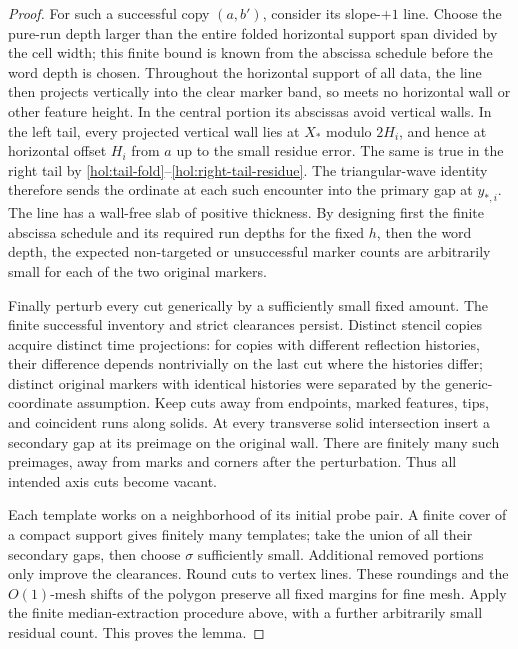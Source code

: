 \begin{proof}
For such a successful copy $(a,b')$, consider its slope-$+1$ line.
Choose the pure-run depth larger than the entire folded horizontal
support span divided by the cell width; this finite bound is known
from the abscissa schedule before the word depth is chosen.  Throughout
the horizontal support of all data, the line then projects vertically
into the clear marker band, so meets no horizontal wall or other
feature height.  In the central portion its abscissas avoid vertical
walls.  In the left tail, every projected vertical wall lies at
$X_*$ modulo $2H_i$, and hence at horizontal offset $H_i$ from $a$
up to the small residue error.  The same is true in the right tail by
\eqref{hol:tail-fold}--\eqref{hol:right-tail-residue}.
The triangular-wave identity therefore sends the ordinate at each
such encounter into the primary gap at $y_{*,i}$.  The line has a
wall-free slab of positive thickness.  By designing first the finite
abscissa schedule and its required run depths for the fixed $h$, then
the word depth, the expected non-targeted or unsuccessful marker
counts are arbitrarily small for each of the two original markers.

Finally perturb every cut generically by a sufficiently small fixed
amount.  The finite successful inventory and strict clearances persist.
Distinct stencil copies acquire distinct time projections: for copies
with different reflection histories, their difference depends
nontrivially on the last cut where the histories differ; distinct
original markers with identical histories were separated by the
generic-coordinate assumption.  Keep cuts away from endpoints,
marked features, tips, and coincident runs along solids.  At every
transverse solid intersection insert a secondary gap at its preimage
on the original wall.  There are finitely many such preimages, away
from marks and corners after the perturbation.  Thus all intended
axis cuts become vacant.

Each template works on a neighborhood of its initial probe pair.
A finite cover of a compact support gives finitely many templates;
take the union of all their secondary gaps, then choose $\sigma$
sufficiently small.  Additional removed portions only improve the
clearances.  Round cuts to vertex lines.  These roundings and the
$O(1)$-mesh shifts of the polygon preserve all fixed margins for fine
mesh.  Apply the finite median-extraction procedure above, with a
further arbitrarily small residual count.  This proves the lemma.
\end{proof}

